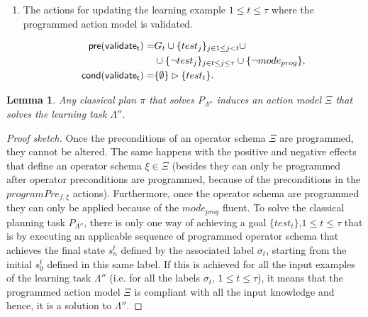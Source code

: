 \documentclass[letterpaper]{article} %
\newcommand{\pre}{\mathsf{pre}}     %
\newcommand{\cond}{\mathsf{cond}}   %
\newtheorem{lemma}[theorem]{Lemma}
\begin{document}
\begin{itemize}
\begin{enumerate}
\item The actions for updating the learning example {\tt\small $1\leq t\leq \tau$} where the programmed action model is validated. 
\begin{small}
\begin{align*}
\hspace*{7pt}\pre(\mathsf{validate_{t}})=&G_t\cup\{test_j\}_{j\in 1\leq j<t}\cup\\
&\cup\{\neg test_j\}_{j\in t\leq j\leq \tau}\cup \{\neg mode_{prog}\},\\
\cond(\mathsf{validate_{t}})=&\{\emptyset\}\rhd\{test_t\}.
\end{align*}
\end{small}
\end{enumerate}
\end{itemize}


\begin{lemma}
Any classical plan $\pi$ that solves $P_{\Lambda''}$ induces an action model $\Xi$ that solves the learning task $\Lambda''$.
\end{lemma}

\begin{proof}[Proof sketch]
Once the preconditions of an operator schema $\Xi$ are programmed, they cannot be altered. The same happens with the positive and negative effects that define an operator schema $\xi \in \Xi$ (besides they can only be programmed after operator preconditions are programmed, because of the preconditions in the $programPre_{f,\xi}$ actions). Furthermore, once the operator schema are programmed they can only be applied because of the $mode_{prog}$ fluent. To solve the classical planning task $P_{\Lambda''}$, there is only one way of achieving a goal $\{test_t\}$,{\small $1\leq t\leq \tau$} that is by executing an applicable sequence of programmed operator schema that achieves the final state $s_n^t$ defined by the associated label $\sigma_t$, starting from the initial $s_0^t$ defined in this same label. If this is achieved for all the input examples of the learning task $\Lambda''$ (i.e. for all the labels $\sigma_t$, {\small $1\leq t\leq \tau$}), it means that the programmed action model $\Xi$ is compliant with all the input knowledge and hence, it is a solution to $\Lambda''$.
\end{proof}
\end{document}
